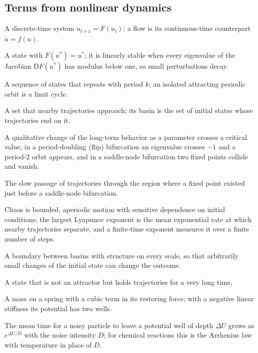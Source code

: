 \subsection*{Terms from nonlinear dynamics}
\begin{description}[leftmargin=0pt,itemsep=1pt,font=\normalfont\bfseries]
\item[Map, flow.] A discrete-time system $u_{t+1}=F(u_t)$; a flow is its continuous-time counterpart $\dot u=f(u)$.
\item[Fixed point, linear stability.] A state with $F(u^\ast)=u^\ast$; it is linearly stable when every eigenvalue of the Jacobian $\mathrm{D}F(u^\ast)$ has modulus below one, so small perturbations decay.
\item[Periodic orbit, limit cycle.] A sequence of states that repeats with period $k$; an isolated attracting periodic orbit is a limit cycle.
\item[Attractor, basin of attraction.] A set that nearby trajectories approach; its basin is the set of initial states whose trajectories end on it.
\item[Bifurcation.] A qualitative change of the long-term behavior as a parameter crosses a critical value; in a period-doubling (flip) bifurcation an eigenvalue crosses $-1$ and a period-2 orbit appears, and in a saddle-node bifurcation two fixed points collide and vanish.
\item[Ghost.] The slow passage of trajectories through the region where a fixed point existed just before a saddle-node bifurcation.
\item[Chaos, Lyapunov exponent.] Chaos is bounded, aperiodic motion with sensitive dependence on initial conditions; the largest Lyapunov exponent is the mean exponential rate at which nearby trajectories separate, and a finite-time exponent measures it over a finite number of steps.
\item[Fractal boundary.] A boundary between basins with structure on every scale, so that arbitrarily small changes of the initial state can change the outcome.
\item[Metastable state.] A state that is not an attractor but holds trajectories for a very long time.
\item[Duffing oscillator.] A mass on a spring with a cubic term in its restoring force; with a negative linear stiffness its potential has two wells.
\item[Kramers escape, Arrhenius law.] The mean time for a noisy particle to leave a potential well of depth $\Delta U$ grows as $e^{\Delta U/D}$ with the noise intensity $D$; for chemical reactions this is the Arrhenius law with temperature in place of $D$.

\end{description}
